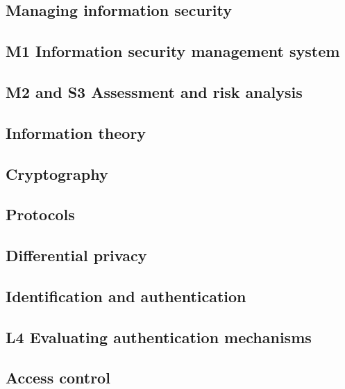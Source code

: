 \subsection{Managing information security}


\subsection{M1 Information security management system}


\subsection{M2 and S3 Assessment and risk analysis}


\subsection{Information theory}


\subsection{Cryptography}


\subsection{Protocols}


\subsection{Differential privacy}


\subsection{Identification and authentication}


\subsection{L4 Evaluating authentication mechanisms}


\subsection{Access control}


